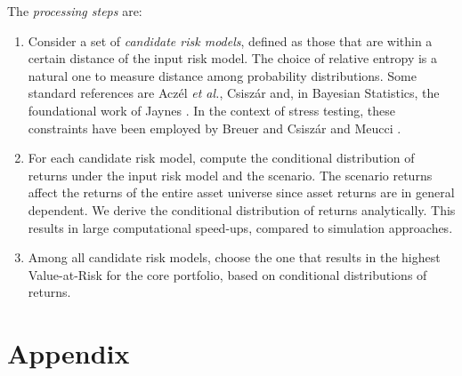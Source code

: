 \documentclass[letter, 12pt]{article}
\newcommand{\R}{\mathbb{R}}
\newcommand{\etal}{\emph{et al.}}
\begin{document}
The \emph{processing steps} are:
\begin{enumerate}
	\item Consider a set of \emph{candidate risk models}, defined as those that are within a certain distance of the input risk model. The choice of relative entropy is a natural one to measure distance among probability distributions. Some standard references are Acz{\'e}l \etal \cite{aczel1974},  Csisz{\'a}r \cite{csiszar1991, csiszar2008} and, in Bayesian Statistics, the foundational work of Jaynes \cite{jaines2003}. In the context of stress testing, these constraints have been employed by Breuer and Csisz{\'a}r \cite{breuer2013, breuer2016} and Meucci \cite{meucci2008}.
	\item For each candidate risk model, compute the conditional distribution of returns under the input risk model and the scenario. The scenario returns affect the returns of the entire asset universe since asset returns are in general dependent. We derive the conditional distribution of returns analytically. This results in large computational speed-ups, compared to simulation approaches.
	\item Among all candidate risk models, choose the one that results in the highest Value-at-Risk for the core portfolio, based on conditional distributions of returns. 
\end{enumerate}
\section{Appendix} 


\end{document}
